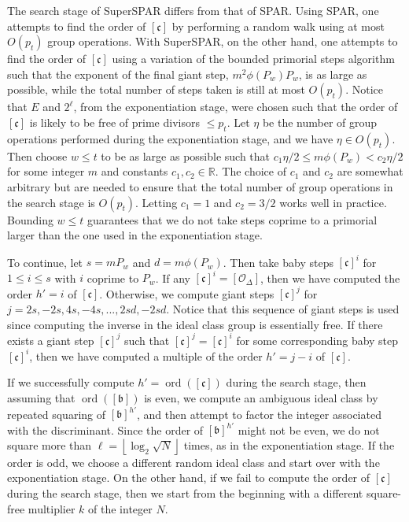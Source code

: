 \documentclass{ucalgthes1}
\theoremstyle{definition}
\DeclareMathOperator{\ord}{ord}
\newcommand{\RR}{\mathbb{R}}
\newcommand{\floor}[1]{\left\lfloor #1 \right\rfloor}
\newcommand{\ideal}{\mathfrak}
\newcommand{\idealclass}[1]{\left[ \ideal #1 \right]}
\newcommand{\bclass}{\idealclass b}
\newcommand{\cclass}{\idealclass c}
\newcommand{\idclass}{[\mathcal O_\Delta]}
\begin{document}
The search stage of SuperSPAR differs from that of SPAR.  Using SPAR, one attempts to find the order of $\cclass$ by performing a random walk using at most $O(p_t)$ group operations.  With SuperSPAR, on the other hand, one attempts to find the order of $\cclass$ using a variation of the bounded primorial steps algorithm such that the exponent of the final giant step, $m^2\phi(P_w)P_w$, is as large as possible, while the total number of steps taken is still at most $O(p_t)$.  Notice that $E$ and $2^\ell$, from the exponentiation stage, were chosen such that the order of $\cclass$ is likely to be free of prime divisors $\le p_t$.  Let $\eta$ be the number of group operations performed during the exponentiation stage, and we have $\eta \in O(p_t)$.  Then choose $w \le t$ to be as large as possible such that $c_1 \eta / 2 \le m\phi(P_w) < c_2 \eta / 2$ for some integer $m$ and constants $c_1, c_2 \in \RR$.  The choice of $c_1$ and $c_2$ are somewhat arbitrary but are needed to ensure that the total number of group operations in the search stage is $O(p_t)$.  Letting $c_1 = 1$ and $c_2 = 3/2$ works well in practice.  Bounding $w \le t$ guarantees that we do not take steps coprime to a primorial larger than the one used in the exponentiation stage.

To continue, let $s = mP_w$ and $d = m\phi(P_w)$.  Then take baby steps $\cclass^i$ for $1 \le i \le s$ with $i$ coprime to $P_w$.  If any $\cclass^i = \idclass$, then we have computed the order $h' = i$ of $\cclass$.  Otherwise, we compute giant steps $\cclass^j$ for $j=2s,-2s,4s,-4s,...,2sd,-2sd$.  Notice that this sequence of giant steps is used since computing the inverse in the ideal class group is essentially free.  If there exists a giant step $\cclass^j$ such that $\cclass^j = \cclass^i$ for some corresponding baby step $\cclass^i$, then we have computed a multiple of the order $h' = j - i$ of $\cclass$.  

If we successfully compute $h' = \ord(\cclass)$ during the search stage, then assuming that $\ord(\bclass)$ is even, we compute an ambiguous ideal class by repeated squaring of $\bclass^{h'}$, and then attempt to factor the integer associated with the discriminant.  Since the order of $\bclass^{h'}$ might not be even, we do not square more than $\ell = \floor{\log_2{\sqrt N}}$ times, as in the exponentiation stage.  If the order is odd, we choose a different random ideal class and start over with the exponentiation stage.  On the other hand, if we fail to compute the order of $\cclass$ during the search stage, then we start from the beginning with a different square-free multiplier $k$ of the integer $N$.
\end{document}
